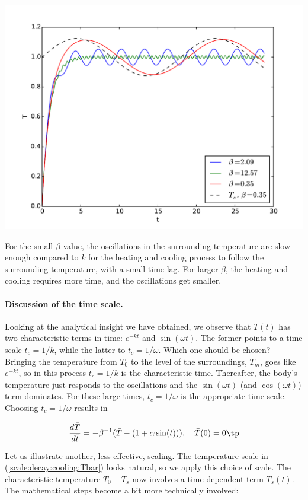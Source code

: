 \documentclass[graybox,envcountchap,sectrefs,final]{svmonodo}
\begin{document}
\centerline{\includegraphics[width=0.8\linewidth]{fig-scaling/osc_cooling.pdf}}



For the small $\beta$ value, the oscillations in the surrounding
temperature are slow enough compared to $k$ for the heating and
cooling process to follow the surrounding temperature, with a small
time lag. For larger $\beta$, the heating and cooling requires more
time, and the oscillations get smaller.

\paragraph{Discussion of the time scale.}
Looking at the analytical insight we have obtained, we
observe that $T(t)$ has two characteristic
terms in time: $e^{-kt}$ and $\sin(\omega t)$. The former points to a time
scale $t_c=1/k$, while the latter to $t_c=1/\omega$.
Which one should be chosen? Bringing the temperature from $T_0$ to
the level of the surroundings, $T_m$, goes like $e^{-kt}$, so
in this process $t_c=1/k$ is the characteristic time. Thereafter,
the body's temperature just responds to the oscillations and the
$\sin (\omega t)$ (and $\cos(\omega t)$) term dominates. For these large times,
$t_c=1/\omega$ is the appropriate time scale. Choosing $t_c=1/\omega$
results in

\begin{equation}
\frac{d\bar T}{d\bar t} = -\beta^{-1}(\bar T - (1 + \alpha\sin (\bar t))),\quad
\bar T(0)=0\tp
\label{scale:decay:cooling:model:scaled2}
\end{equation}


Let us illustrate another, less effective, scaling.
The temperature scale in
(\ref{scale:decay:cooling:Tbar}) looks natural, so we apply this
choice of scale. The characteristic temperature $T_0-T_s$
now involves
a time-dependent term $T_s(t)$. The mathematical steps become a bit
more technically involved:
\end{document}

